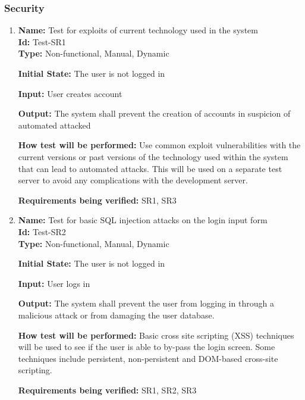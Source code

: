 \documentclass[12pt, titlepage]{article}
\begin{document}
\subsubsection{Security}
\begin{enumerate}
    \item{\textbf{Name:} Test for exploits of current technology used in the system\\} \label{Test-SR1}
   \textbf{Id: }Test-SR1\\
   
    \textbf{Type:} Non-functional, Manual, Dynamic
    					
    \textbf{Initial State:} The user is not logged in
    					
    \textbf{Input:} User creates account
    					
    \textbf{Output:} The system shall prevent the creation of accounts in suspicion of automated attacked
    					
    \textbf{How test will be performed:} Use common exploit vulnerabilities with the current versions or past versions of the technology used within the system that can lead to automated attacks. This will be used on a separate test server to avoid any complications with the development server.
    
    \textbf{Requirements being verified:} SR1, SR3
    
    \item{\textbf{Name:} Test for basic SQL injection attacks on the login input form\\} \label{Test-SR2}
    \textbf{Id:} Test-SR2\\
    
    \textbf{Type:} Non-functional, Manual, Dynamic
    					
    \textbf{Initial State:} The user is not logged in
    					
    \textbf{Input:} User logs in
    					
    \textbf{Output:} The system shall prevent the user from logging in through a malicious attack or from damaging the user database.
    					
    \textbf{How test will be performed:} Basic cross site scripting (XSS) techniques will be used to see if the user is able to by-pass the login screen. Some techniques include persistent, non-persistent and DOM-based cross-site scripting.
    
    \textbf{Requirements being verified:} SR1, SR2, SR3
    
    

\end{enumerate}
\end{document}
